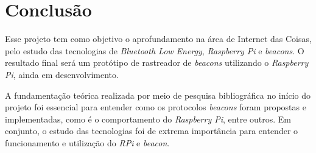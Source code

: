 \documentclass[
		12pt,				%
		openright,			%
		oneside,			%
		a4paper,			%
		chapter=TITLE,		%
		english,			%
		brazil				%
	]{abntex2}
\begin{document}



\chapter{Conclusão}

Esse projeto tem como objetivo o aprofundamento na área de Internet das Coisas, pelo estudo das tecnologias de \textit{Bluetooth Low Energy}, \textit{Raspberry Pi} e \textit{beacons}. O resultado final será um protótipo de rastreador de \textit{beacons} utilizando o \textit{Raspberry Pi}, ainda em desenvolvimento.

A fundamentação teórica realizada por meio de pesquisa bibliográfica no início do projeto foi essencial para entender como os protocolos \textit{beacons} foram propostas e implementadas, como é o comportamento do \textit{Raspberry Pi}, entre outros. Em conjunto, o estudo das tecnologias foi de extrema importância para entender o funcionamento e utilização do \textit{RPi} e \textit{beacon}.
\end{document}
